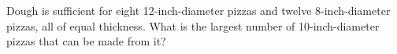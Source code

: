 Dough is sufficient for eight 12-inch-diameter pizzas and twelve 8-inch-diameter pizzas, all of equal thickness. What is the largest number of 10-inch-diameter pizzas that can be made from it?
